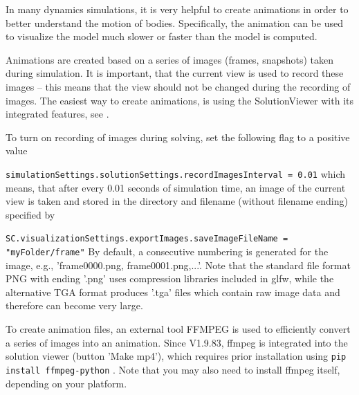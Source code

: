%
In many dynamics simulations, it is very helpful to create animations in order to better understand the motion of bodies. Specifically, the animation can be used to visualize the model much slower or faster than the model is computed.

Animations are created based on a series of images (frames, snapshots) taken during simulation. It is important, that the current view is used to record these images -- this means that the view should not be changed during the recording of images.
The easiest way to create animations, is using the SolutionViewer with its integrated features, see .

To turn on recording of images during solving, set the following flag to a positive value
\bi
  \item \texttt{simulationSettings.solutionSettings.recordImagesInterval = 0.01}
\ei
which means, that after every 0.01 seconds of simulation time, an image of the current view is taken and stored in the directory and filename (without filename ending) specified by 
\bi
  \item \texttt{SC.visualizationSettings.exportImages.saveImageFileName = "myFolder/frame"}
\ei
By default, a consecutive numbering is generated for the image, e.g., 'frame0000.png, frame0001.png,...'. Note that the standard file format PNG with ending '.png' uses compression libraries included in glfw, while the alternative TGA format produces '.tga' files which contain raw image data and therefore can become very large.

To create animation files, an external tool FFMPEG is used to efficiently convert a series of images into an animation. Since \codeName V1.9.83, ffmpeg is integrated into the solution viewer (button 'Make mp4'), which requires prior installation using \texttt{pip install ffmpeg-python} . 
Note that you may also need to install ffmpeg itself, depending on your platform.


